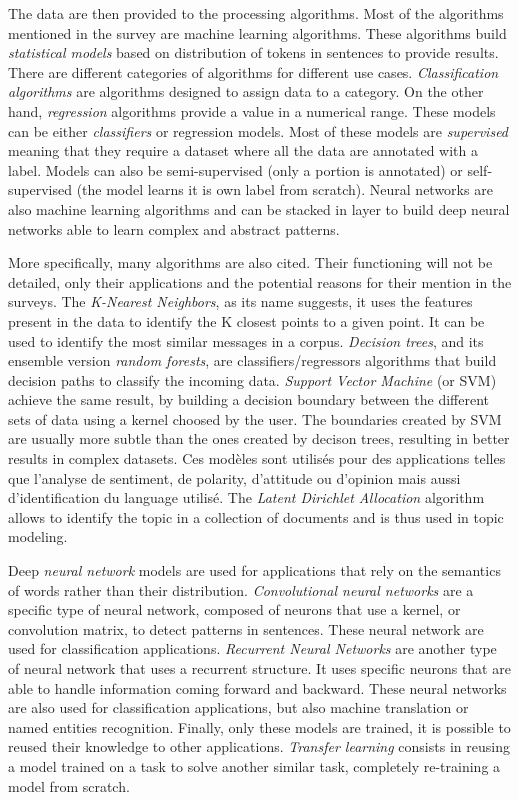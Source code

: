 The data are then provided to the processing algorithms.
Most of the algorithms mentioned in the survey are machine learning algorithms.
These algorithms build \emph{statistical models} based on distribution of tokens in sentences to provide results.
There are different categories of algorithms for different use cases.
\emph{Classification algorithms} are algorithms designed to assign data to a category.
On the other hand, \emph{regression} algorithms provide a value in a numerical range.
These models can be either \emph{classifiers} or regression models.
Most of these models are \emph{supervised} meaning that they require a dataset where all the data are annotated with a label.
Models can also be semi-supervised (only a portion is annotated) or self-supervised (the model learns it is own label from scratch).
Neural networks are also machine learning algorithms and can be stacked in layer to build deep neural networks able to learn complex and abstract patterns.

More specifically, many algorithms are also cited. Their functioning will not be detailed, only their applications and the potential reasons for their mention in the surveys.
The \emph{K-Nearest Neighbors}, as its name suggests, it uses the features present in the data to identify the K closest points to a given point.
It can be used to identify the most similar messages in a corpus.
\emph{Decision trees}, and its ensemble version \emph{random forests}, are classifiers/regressors algorithms that build decision paths to classify the incoming data.
\emph{Support Vector Machine} (or SVM) achieve the same result, by building a decision boundary between the different sets of data using a kernel choosed by the user.
The boundaries created by SVM are usually more subtle than the ones created by decison trees, resulting in better results in complex datasets.
Ces modèles sont utilisés pour des applications telles que l'analyse de sentiment, de polarity, d'attitude ou d'opinion mais aussi d'identification du language utilisé.
The \emph{Latent Dirichlet Allocation} algorithm allows to identify the topic in a collection of documents and is thus used in topic modeling.

Deep \emph{neural network} models are used for applications that rely on the semantics of words rather than their distribution.
\emph{Convolutional neural networks} are a specific type of neural network, composed of neurons that use a kernel, or convolution matrix, to detect patterns in sentences.
These neural network are used for classification applications.
\emph{Recurrent Neural Networks} are another type of neural network that uses a recurrent structure.
It uses specific neurons that are able to handle information coming forward and backward.
These neural networks are also used for classification applications, but also machine translation or named entities recognition.
Finally, only these models are trained, it is possible to reused their knowledge to other applications.
\emph{Transfer learning} consists in reusing a model trained on a task to solve another similar task, completely re-training a model from scratch.

